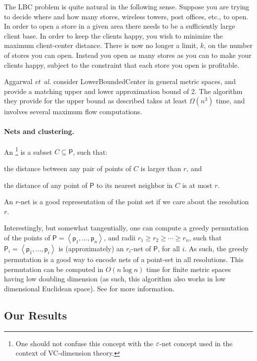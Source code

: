 \ifx\STACS\undefined \documentclass[12pt]{article}\else \documentclass[runningheads,a4paper]{llncs}
\newcommand{\LowerBoundedCenter}   {\PStyle{{Lower{}Bounded{}Center}}\xspace}
\newcommand{\lbc}{\PStyle{LBC}\xspace}
\newcommand{\emphi}[1]{\emphic{#1}{#1}}
\newcommand{\PStyle}[1]{\textcolor{red25}{\textrm{\textsf{#1}}}}
\newcommand{\permut}[1]{\left\langle {#1} \right\rangle}
\newcommand{\etal}{\textit{et~al.}\xspace}
\newcommand{\pnt}{{\mathsf{p}}}\newcommand{\pntA}{{\mathsf{q}}}\newcommand{\pntB}{{\mathsf{s}}}
\newcommand{\PntSet}{\mathsf{P}}\newcommand{\PntSetA}{\mathsf{W}}
\begin{document}
The \lbc problem is quite natural in the following sense.  Suppose
you are trying to decide where and how many stores, wireless towers,
post offices, etc., to open.  In order to open a store in a given
area there needs to be a sufficiently large client base.  In order to
keep the clients happy, you wish to minimize the maximum
client-center distance.  There is now no longer a limit, $k$, on the
number of stores you can open.  Instead you open as many stores as
you can to make your clients happy, subject to the constraint that
each store you open is profitable.

Aggarwal \etal \cite{apftkkz-aac-10} consider \LowerBoundedCenter in
general metric spaces, and provide a matching upper and lower
approximation bound of 2.  The algorithm they provide for the upper
bound as described takes at least $\Omega(n^3)$ time, and involves
several maximum flow computations.



\paragraph*{Nets and clustering.} An \emphi{$r$-net}\footnote{One should not confuse this concept with
   the $\varepsilon$-net concept used in the context of VC-dimension theory.}
is a subset $C \subseteq \PntSet$, such that:
\begin{inparaenum}[(i)]
    \item the distance between any pair of points of $C$ is larger than
    $r$, and
    \item the distance of any point of $\PntSet$ to its nearest
    neighbor in $C$ is at most $r$.
\end{inparaenum}
An $r$-net is a good representation of the point set if we care about
the resolution $r$.

Interestingly, but somewhat tangentially, one can compute a greedy
permutation of the points of $\PntSet = \permut{\pnt_1, \ldots,
   \pnt_n}$, and radii $r_1 \geq r_2 \geq \cdots \geq r_n$, such that
$\PntSet_i = \permut{\pnt_1, \ldots, \pnt_i}$ is (approximately) an
$r_i$-net of $\PntSet$, for all $i$. As such, the greedy permutation
is a good way to encode nets of a point-set in all resolutions.  This
permutation can be computed in $O(n \log n)$ time for finite metric
spaces having low doubling dimension \cite{hm-fcnld-06} (as such, this
algorithm also works in low dimensional Euclidean space). See
\cite{h-gaa-11} for more information.


\subsection{Our Results}
\end{document}
